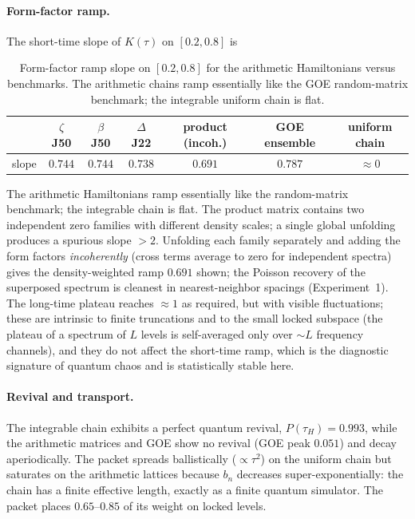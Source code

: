 \documentclass[aps,prx,reprint,floatfix]{revtex4-2}
\begin{document}
\paragraph{Form-factor ramp.}
The short-time slope of $K(\tau)$ on $[0.2,0.8]$ is
\begin{table}[t]
\centering
\footnotesize
\caption{Form-factor ramp slope on $[0.2,0.8]$ for the arithmetic Hamiltonians
versus benchmarks. The arithmetic chains ramp essentially like the GOE
random-matrix benchmark; the integrable uniform chain is flat.}
\label{tab:ramp}
\begin{tabular}{lcccccc}
\toprule
 & $\zeta$ J50 & $\beta$ J50 & $\Delta$ J22 & product (incoh.) & GOE ensemble & uniform chain\\
\midrule
slope & $0.744$ & $0.744$ & $0.738$ & $0.691$ & $0.787$ & $\approx0$\\
\bottomrule
\end{tabular}
\end{table}
The arithmetic Hamiltonians ramp essentially like the random-matrix
benchmark; the integrable chain is flat. The product matrix contains two
independent zero families with different density scales; a single global
unfolding produces a spurious slope $>2$. Unfolding each family separately
and adding the form factors \emph{incoherently} (cross terms average to zero
for independent spectra) gives the density-weighted ramp $0.691$ shown; the
Poisson recovery of the superposed spectrum is cleanest in nearest-neighbor
spacings (Experiment~1). The long-time plateau reaches $\approx1$ as
required, but with visible fluctuations; these are intrinsic to finite
truncations and to the small locked subspace (the plateau of a spectrum of
$L$ levels is self-averaged only over $\sim L$ frequency channels), and they
do not affect the short-time ramp, which is the diagnostic signature of
quantum chaos and is statistically stable here.

\paragraph{Revival and transport.}
The integrable chain exhibits a perfect quantum revival,
$P(\tau_H)=0.993$, while the arithmetic matrices and GOE show no revival
(GOE peak $0.051$) and decay aperiodically. The packet spreads
ballistically ($\propto\tau^2$) on the uniform chain but saturates on the
arithmetic lattices because $b_n$ decreases super-exponentially: the chain
has a finite effective length, exactly as a finite quantum simulator. The
packet places $0.65$--$0.85$ of its weight on locked levels.
\end{document}
